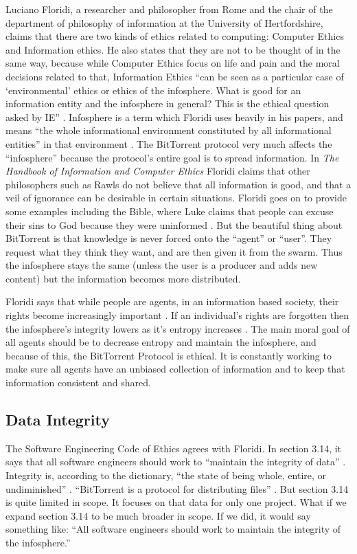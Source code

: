 \documentclass[11pt]{article}
\begin{document}
Luciano Floridi, a researcher and philosopher from Rome and the chair of the department of philosophy of information at the University of Hertfordshire, claims that there are two kinds of ethics related to computing: Computer Ethics and Information ethics. He also states that they are not to be thought of in the same way, because while Computer Ethics focus on life and pain and the moral decisions related to that, Information Ethics ``can be seen as a particular case of `environmental' ethics or ethics of the infosphere. What is good for an information entity and the infosphere in general? This is the ethical question asked by IE'' \cite[1]{floridiInfo}. Infosphere is a term which Floridi uses heavily in his papers, and means ``the whole informational environment constituted by all informational entities'' in that environment \cite[3]{ethicshandbook}. The BitTorrent protocol very much affects the ``infosphere'' because the protocol's entire goal is to spread information. In \textit{The Handbook of Information and Computer Ethics} Floridi claims that other philosophers such as Rawls do not believe that all information is good, and that a veil of ignorance can be desirable in certain situations. Floridi goes on to provide some examples including the Bible, where Luke claims that people can excuse their sins to God because they were uninformed \cite[6]{ethicshandbook}. But the beautiful thing about BitTorrent is that knowledge is never forced onto the ``agent'' or ``user''. They request what they think they want, and are then given it from the swarm. Thus the infosphere stays the same (unless the user is a producer and adds new content) but the information becomes more distributed.

Floridi says that while people are agents, in an information based society, their rights become increasingly important \cite[4]{floridiInfo}. If an individual's rights are forgotten then the infosphere's integrity lowers as it's entropy increases \cite[10]{floridiInfo}. The main moral goal of all agents should be to decrease entropy and maintain the infosphere, and because of this, the BitTorrent Protocol is ethical. It is constantly working to make sure all agents have an unbiased collection of information and to keep that information consistent and shared.

\subsection{Data Integrity}

The Software Engineering Code of Ethics agrees with Floridi. In section 3.14, it says that all software engineers should work to ``maintain the integrity of data'' \cite[3.14]{secode}. Integrity is, according to the dictionary, ``the state of being whole, entire, or undiminished'' \cite{integrity}. ``BitTorrent is a protocol for distributing files'' \cite{btspec}. But section 3.14 is quite limited in scope. It focuses on that data for only one project. What if we expand section 3.14 to be much broader in scope. If we did, it would say something like: ``All software engineers should work to maintain the integrity of the infosphere.''
\end{document}

